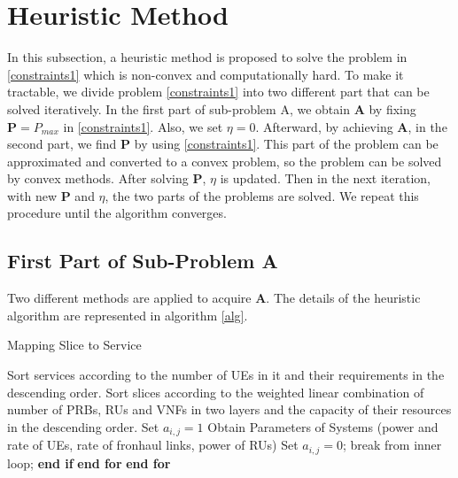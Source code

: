 \documentclass[conference]{IEEEtran}
\begin{document}
\section{Heuristic Method}\label{proposedmethod}
In this subsection, a heuristic  method is proposed to solve the problem in \eqref{constraints1} which is non-convex and computationally hard. To make it tractable, we divide problem \eqref{constraints1} into
two different part that can be solved iteratively.
In the first part of sub-problem A, we obtain $\boldsymbol{A}$ by fixing $\boldsymbol{P} = P_{max}$ in \eqref{constraints1}. Also, we set $\eta = 0$. Afterward, by achieving $\boldsymbol{A}$, in the second part, we find $\boldsymbol{P}$ by using \eqref{constraints1}. This part of the problem can be approximated and converted to a convex problem, so the problem can be solved by convex methods. After solving $\boldsymbol{P}$, $\eta$ is updated. Then in the next iteration, with new $\boldsymbol{P}$
and $\eta$, the two parts of the problems are solved. We repeat this procedure until the algorithm  converges.
\subsection{First Part of Sub-Problem A}\label{firstsub}
Two different methods are applied to acquire $\boldsymbol{A}$.
The details of the heuristic algorithm are represented in algorithm \ref{alg}.
\begin{algorithm}
\caption{Mapping Slice to Service}\label{alg}
\begin{algorithmic}[1]
\State Sort services according to the number of UEs in it and their requirements in the descending order.
\State Sort slices according to the weighted linear combination of number of PRBs, RUs and VNFs in two layers and the capacity of their resources in the descending order.
\State Set $a_{i,j} = 1$
\State Obtain Parameters of Systems (power and rate of UEs, rate of fronhaul links, power of RUs)
\State Set $a_{i,j} = 0$;
\Else
\State break from inner loop;
\EndIf
\State \textbf{end if}
\EndFor
\State \textbf{end for}
\EndFor
\State \textbf{end for}
\end{algorithmic}
\end{algorithm}
\end{document}

